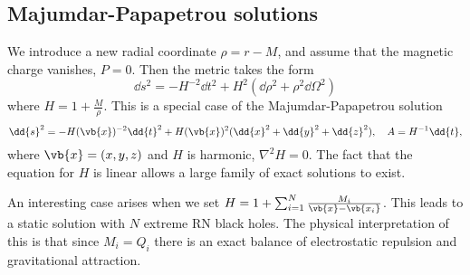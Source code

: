 \documentclass{jknotes}
\begin{document}
\subsection{Majumdar-Papapetrou solutions}
We introduce a new radial coordinate \(\rho = r-M\), and assume that the magnetic charge vanishes, \(P=0\). Then the metric takes the form
\begin{equation}
    \dd{s}^2 = -H^{-2}\dd{t}^2 + H^2(\dd{\rho}^2 + \rho^2\dd{\Omega}^2)
\end{equation}
where \(H=1+\frac{M}{\rho}\). This is a special case of the Majumdar-Papapetrou solution
\begin{equation}
    \dd{s}^2 = -H(\vb{x})^{-2}\dd{t}^2 + H(\vb{x})^2 (\dd{x}^2 + \dd{y}^2 + \dd{z}^2), \quad A = H^{-1}\dd{t},
\end{equation}
where \(\vb{x} = (x,y,z)\) and \(H\) is harmonic, \(\nabla^2H=0\). The fact that the equation for \(H\) is linear allows a large family of exact solutions to exist.

An interesting case arises when we set \(H = 1 + \sum^N_{i=1}\frac{M_i}{\vb{x}-\vb{x_i}}\). This leads to a static solution with \(N\) extreme RN black holes. The physical interpretation of this is that since \(M_i=Q_i\) there is an exact balance of electrostatic repulsion and gravitational attraction.
\end{document}
